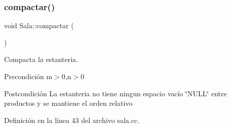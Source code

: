 \subsubsection{\texorpdfstring{compactar()}{compactar()}}
{\footnotesize\ttfamily void Sala\+::compactar (\begin{DoxyParamCaption}{ }\end{DoxyParamCaption})}



Compacta la estanteria. 

\begin{DoxyPrecond}{Precondición}
m$>$0,n$>$0 
\end{DoxyPrecond}
\begin{DoxyPostcond}{Postcondición}
La estanteria no tiene ningun espacio vacío \char`\"{}\+N\+U\+L\+L\char`\"{} entre productos y se mantiene el orden relativo 
\end{DoxyPostcond}


Definición en la línea 43 del archivo sala.\+cc.


